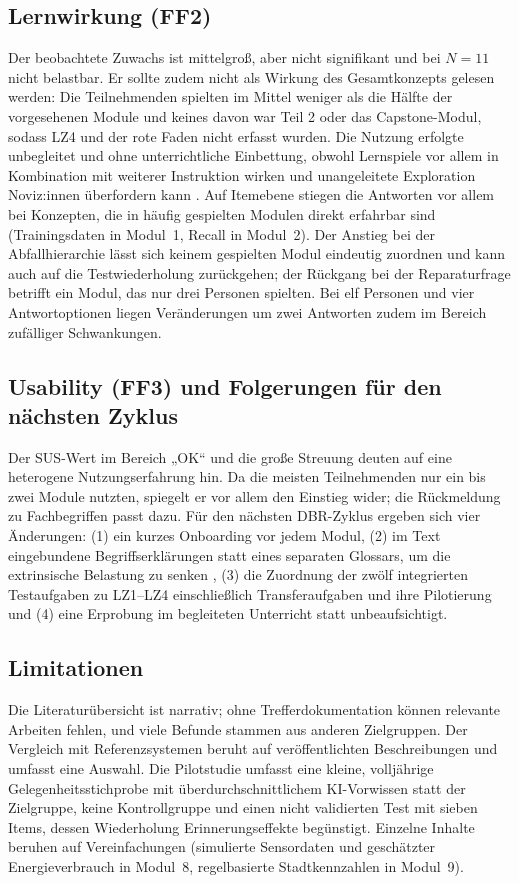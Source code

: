 \documentclass[sigconf,nonacm]{acmart}
\begin{document}
\subsection{Lernwirkung (FF2)}
Der beobachtete Zuwachs ist mittelgroß, aber nicht signifikant und bei $N = 11$ nicht belastbar. Er sollte zudem nicht als Wirkung des Gesamtkonzepts gelesen werden: Die Teilnehmenden spielten im Mittel weniger als die Hälfte der vorgesehenen Module und keines davon war Teil 2 oder das Capstone-Modul, sodass LZ4 und der rote Faden nicht erfasst wurden. Die Nutzung erfolgte unbegleitet und ohne unterrichtliche Einbettung, obwohl Lernspiele vor allem in Kombination mit weiterer Instruktion wirken \cite{wouters2013} und unangeleitete Exploration Noviz:innen überfordern kann \cite{kirschner2006}. Auf Itemebene stiegen die Antworten vor allem bei Konzepten, die in häufig gespielten Modulen direkt erfahrbar sind (Trainingsdaten in Modul~1, Recall in Modul~2). Der Anstieg bei der Abfallhierarchie lässt sich keinem gespielten Modul eindeutig zuordnen und kann auch auf die Testwiederholung zurückgehen; der Rückgang bei der Reparaturfrage betrifft ein Modul, das nur drei Personen spielten. Bei elf Personen und vier Antwortoptionen liegen Veränderungen um zwei Antworten zudem im Bereich zufälliger Schwankungen.

\subsection{Usability (FF3) und Folgerungen für den nächsten Zyklus}
Der SUS-Wert im Bereich „OK“ und die große Streuung deuten auf eine heterogene Nutzungserfahrung hin. Da die meisten Teilnehmenden nur ein bis zwei Module nutzten, spiegelt er vor allem den Einstieg wider; die Rückmeldung zu Fachbegriffen passt dazu. Für den nächsten DBR-Zyklus ergeben sich vier Änderungen: (1) ein kurzes Onboarding vor jedem Modul, (2) im Text eingebundene Begriffserklärungen statt eines separaten Glossars, um die extrinsische Belastung zu senken \cite{mayer2009}, (3) die Zuordnung der zwölf integrierten Testaufgaben zu LZ1--LZ4 einschließlich Transferaufgaben und ihre Pilotierung und (4) eine Erprobung im begleiteten Unterricht statt unbeaufsichtigt.

\subsection{Limitationen}
Die Literaturübersicht ist narrativ; ohne Trefferdokumentation können relevante Arbeiten fehlen, und viele Befunde stammen aus anderen Zielgruppen. Der Vergleich mit Referenzsystemen beruht auf veröffentlichten Beschreibungen und umfasst eine Auswahl. Die Pilotstudie umfasst eine kleine, volljährige Gelegenheitsstichprobe mit überdurchschnittlichem KI-Vorwissen statt der Zielgruppe, keine Kontrollgruppe und einen nicht validierten Test mit sieben Items, dessen Wiederholung Erinnerungseffekte begünstigt. Einzelne Inhalte beruhen auf Vereinfachungen (simulierte Sensordaten und geschätzter Energieverbrauch in Modul~8, regelbasierte Stadtkennzahlen in Modul~9).
\end{document}
